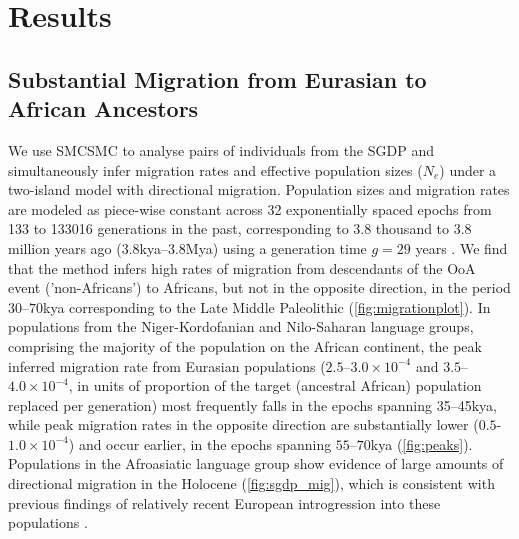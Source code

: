 \section{Results}

\subsection{Substantial Migration from Eurasian to African Ancestors} We use SMCSMC to analyse pairs of individuals from the SGDP and simultaneously infer migration rates and effective population sizes ($N_e$) under a two-island model with directional migration.  Population sizes and migration rates are modeled as piece-wise constant across 32 exponentially spaced epochs from 133 to 133016 generations in the past, corresponding to 3.8 thousand to 3.8 million years ago (3.8kya--3.8Mya) using a generation time $g=29$ years \cite{Fenner2005}.  We find that the method infers high rates of migration from descendants of the OoA event ('non-Africans') to Africans, but not in the opposite direction, in the period $30$--$70$kya corresponding to the Late Middle Paleolithic (\ref{fig:migrationplot}). In populations from the Niger-Kordofanian and Nilo-Saharan language groups, comprising the majority of the population on the African continent, the peak inferred migration rate from Eurasian populations ($2.5$--$3.0\times 10^{-4}$ and $3.5$--$4.0\times 10^{-4}$, in units of proportion of the target (ancestral African) population replaced per generation) most frequently falls in the epochs spanning 35--45kya, while peak migration rates in the opposite direction are substantially lower ($0.5$-$1.0\times 10^{-4}$) and occur earlier, in the epochs spanning $55$--$70$kya (\ref{fig:peaks}). Populations in the Afroasiatic language group show evidence of large amounts of directional migration in the Holocene (\ref{fig:sgdp_mig}), which is consistent with previous findings of relatively recent European introgression into these populations \cite{Busby2016, Fan2019}. 


